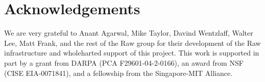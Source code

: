 \section{Acknowledgements}

We are very grateful to Anant Agarwal, Mike Taylor, Davind Wentzlaff,
Walter Lee, Matt Frank, and the rest of the Raw group for their
development of the Raw infrastructure and wholeharted support of this
project.  This work is supported in part by a grant from DARPA (PCA
F29601-04-2-0166), an award from NSF (CISE EIA-0071841), and a
fellowship from the Singapore-MIT Alliance.
